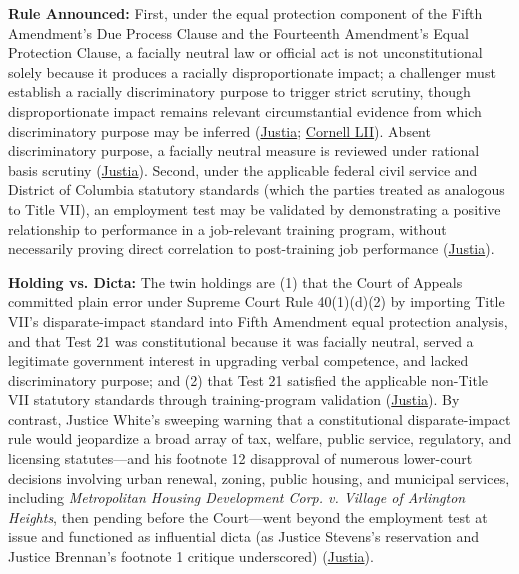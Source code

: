 \documentclass[12pt]{article}
\begin{document}
\textbf{Rule Announced:} First, under the equal protection component of the Fifth Amendment's Due Process Clause and the Fourteenth Amendment's Equal Protection Clause, a facially neutral law or official act is not unconstitutional solely because it produces a racially disproportionate impact; a challenger must establish a racially discriminatory purpose to trigger strict scrutiny, though disproportionate impact remains relevant circumstantial evidence from which discriminatory purpose may be inferred (\href{https://supreme.justia.com/cases/federal/us/426/229/}{Justia}; \href{https://www.law.cornell.edu/constitution-conan/amendment-14/facially-neutral-laws-implicating-suspect-classifications}{Cornell LII}). Absent discriminatory purpose, a facially neutral measure is reviewed under rational basis scrutiny (\href{https://supreme.justia.com/cases/federal/us/426/229/}{Justia}). Second, under the applicable federal civil service and District of Columbia statutory standards (which the parties treated as analogous to Title VII), an employment test may be validated by demonstrating a positive relationship to performance in a job-relevant training program, without necessarily proving direct correlation to post-training job performance (\href{https://supreme.justia.com/cases/federal/us/426/229/}{Justia}).

\textbf{Holding vs. Dicta:} The twin holdings are (1) that the Court of Appeals committed plain error under Supreme Court Rule 40(1)(d)(2) by importing Title VII's disparate-impact standard into Fifth Amendment equal protection analysis, and that Test 21 was constitutional because it was facially neutral, served a legitimate government interest in upgrading verbal competence, and lacked discriminatory purpose; and (2) that Test 21 satisfied the applicable non-Title VII statutory standards through training-program validation (\href{https://supreme.justia.com/cases/federal/us/426/229/}{Justia}). By contrast, Justice White's sweeping warning that a constitutional disparate-impact rule would jeopardize a broad array of tax, welfare, public service, regulatory, and licensing statutes---and his footnote 12 disapproval of numerous lower-court decisions involving urban renewal, zoning, public housing, and municipal services, including \textit{Metropolitan Housing Development Corp. v. Village of Arlington Heights}, then pending before the Court---went beyond the employment test at issue and functioned as influential dicta (as Justice Stevens's reservation and Justice Brennan's footnote 1 critique underscored) (\href{https://supreme.justia.com/cases/federal/us/426/229/}{Justia}).
\end{document}
